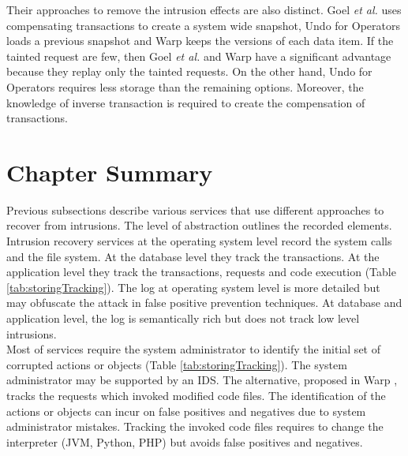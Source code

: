 Their approaches to remove the intrusion effects are also distinct. Goel \textit{et al.} uses compensating transactions to create a system wide snapshot, Undo for Operators loads a previous snapshot and Warp keeps the versions of each data item. If the tainted request are few, then Goel \textit{et al.} and Warp have a significant advantage because they replay only the tainted requests. On the other hand, Undo for Operators requires less storage than the remaining options. Moreover, the knowledge of inverse transaction is required to create the compensation of transactions. \\







\section{Chapter Summary}
\label{sec:related:discuss}
Previous subsections describe various services that use different approaches to recover from intrusions. The level of abstraction outlines the recorded elements. Intrusion recovery services at the operating system level record the system calls and the file system. At the database level they track the transactions. At the application level they track the transactions, requests and code execution (Table \ref{tab:storingTracking}). The log at operating system level is more detailed but may obfuscate the attack in false positive prevention techniques. At database and application level, the log is semantically rich but does not track low level intrusions.\\


Most of services require the system administrator to identify the initial set of corrupted actions or objects (Table \ref{tab:storingTracking}). The system administrator may be supported by an \acf{IDS}. The alternative, proposed in Warp \cite{warp}, tracks the requests which invoked modified code files. The identification of the actions or objects can incur on false positives and negatives due to system administrator mistakes. Tracking the invoked code files requires to change the interpreter (JVM, Python, PHP) but avoids false positives and negatives.\\

